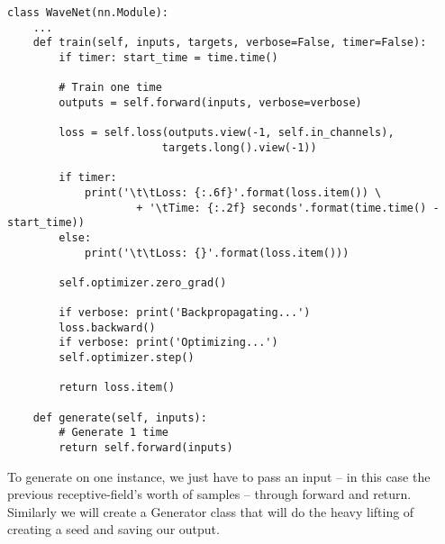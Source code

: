 \begin{verbatim}
class WaveNet(nn.Module):
    ...
    def train(self, inputs, targets, verbose=False, timer=False):
        if timer: start_time = time.time()

        # Train one time
        outputs = self.forward(inputs, verbose=verbose)

        loss = self.loss(outputs.view(-1, self.in_channels),
                        targets.long().view(-1))

        if timer:
            print('\t\tLoss: {:.6f}'.format(loss.item()) \
                    + '\tTime: {:.2f} seconds'.format(time.time() - start_time))
        else:
            print('\t\tLoss: {}'.format(loss.item()))

        self.optimizer.zero_grad()

        if verbose: print('Backpropagating...')
        loss.backward()
        if verbose: print('Optimizing...')
        self.optimizer.step()

        return loss.item()
        
    def generate(self, inputs):
        # Generate 1 time
        return self.forward(inputs)
\end{verbatim}

To generate on one instance, we just have to pass an input -- in this case the previous receptive-field's worth of samples -- through forward and return. Similarly we will create a Generator class that will do the heavy lifting of creating a seed and saving our output.